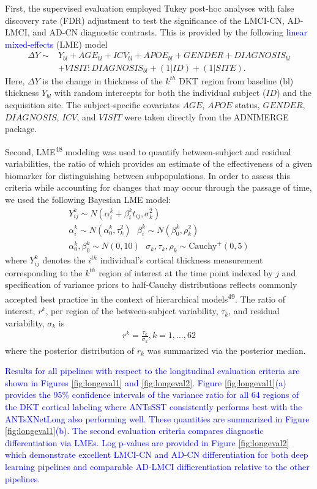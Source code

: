 \documentclass[12pt,]{article}
\begin{document}
First, the supervised evaluation employed Tukey post-hoc analyses with
false discovery rate (FDR) adjustment to test the significance of the
LMCI-CN, AD-LMCI, and AD-CN diagnostic contrasts. This is provided by
the following \textcolor{blue}{linear mixed-effects} (LME) model
\begin{align}
  \Delta Y \sim & Y_{bl} + AGE_{bl} + ICV_{bl} + APOE_{bl} + GENDER + DIAGNOSIS_{bl} \\ \nonumber
                & + VISIT:DIAGNOSIS_{bl} + (1 | ID) + (1 | SITE).
\end{align} Here, \(\Delta Y\) is the change in thickness of the
\(k^{th}\) DKT region from baseline (bl) thickness \(Y_{bl}\) with
random intercepts for both the individual subject (\(ID\)) and the
acquisition site. The subject-specific covariates \(AGE\), \(APOE\)
status, \(GENDER\), \(DIAGNOSIS\), \(ICV\), and \(VISIT\) were taken
directly from the ADNIMERGE package.

Second, LME\textsuperscript{48} modeling was used to quantify
between-subject and residual variabilities, the ratio of which provides
an estimate of the effectiveness of a given biomarker for distinguishing
between subpopulations. In order to assess this criteria while
accounting for changes that may occur through the passage of time, we
used the following Bayesian LME model: \begin{gather}
  Y^k_{ij} \sim N(\alpha^k_i + \beta^k_i t_{ij}, \sigma_k^2) \\ \nonumber
  \alpha^k_i \sim N(\alpha^k_0, \tau^2_k) \,\,\,\, \beta^k_i \sim N(\beta^k_0, \rho^2_k) \\ \nonumber
  \alpha^k_0, \beta^k_0 \sim N(0,10) \,\,\,\,  \sigma_k, \tau_k, \rho_k \sim \mbox{Cauchy}^+ (0, 5)
\end{gather} where \(Y^k_{ij}\) denotes the \(i^{th}\) individual's
cortical thickness measurement corresponding to the \(k^{th}\) region of
interest at the time point indexed by \(j\) and specification of
variance priors to half-Cauchy distributions reflects commonly accepted
best practice in the context of hierarchical models\textsuperscript{49}.
The ratio of interest, \(r^k\), per region of the between-subject
variability, \(\tau_k\), and residual variability, \(\sigma_k\) is
\begin{align}
  r^k = \frac{\tau_k}{\sigma_k}, k = 1,\ldots,62
\end{align} where the posterior distribution of \(r_k\) was summarized
via the posterior median.

\textcolor{blue}{Results for all pipelines with respect to the longitudinal
evaluation criteria are shown in Figures \ref{fig:longeval1} and
\ref{fig:longeval2}.  Figure \ref{fig:longeval1}(a) provides the 95\% confidence
intervals of the variance ratio for all 64 regions of the DKT cortical labeling
where ANTsSST consistently performs best with the ANTsXNetLong also performing
well.  These quantities are summarized in Figure \ref{fig:longeval1}(b).  The
second evaluation criteria compares diagnostic differentiation via LMEs.  Log
p-values are provided in Figure \ref{fig:longeval2} which demonstrate excellent
LMCI-CN and AD-CN differentiation for both deep learning pipelines and
comparable AD-LMCI diffierentiation relative to the other pipelines.}
\end{document}
